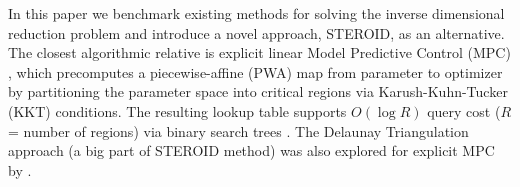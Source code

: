 \documentclass[review,onefignum,onetabnum]{./SIAM_template/siamart171218}
\begin{document}
In this paper we benchmark existing methods for solving the inverse dimensional
reduction problem and introduce a novel approach, STEROID, as an alternative.
The closest algorithmic relative is explicit linear Model Predictive Control
(MPC) \cite{Bemporad2002}, which precomputes a piecewise-affine (PWA) map from
parameter to optimizer by partitioning the parameter space into critical
regions via Karush-Kuhn-Tucker (KKT) conditions.
The resulting lookup table
supports $O(\log R)$ query cost ($R$ = number of regions) via binary search
trees \cite{Tondel2003, Fuchs2010}.
The Delaunay Triangulation approach (a big part of
STEROID method) was also explored for explicit MPC by \cite{Scibilia2009}.

\end{document}
